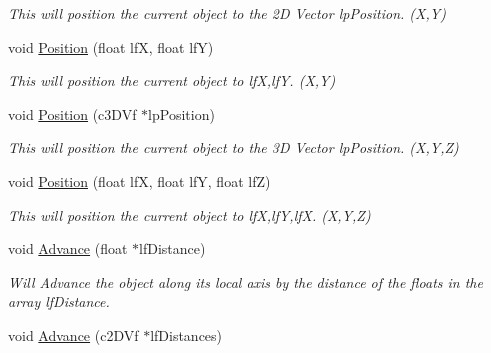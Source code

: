 \begin{DoxyCompactItemize}
\begin{DoxyCompactList}\small\item\em This will position the current object to the 2D Vector lpPosition. (X,Y) \end{DoxyCompactList}\item 
\hypertarget{classc_matrix4_a81cd364d37dc5eae6f968551331ad7a3}{
void \hyperlink{classc_matrix4_a81cd364d37dc5eae6f968551331ad7a3}{Position} (float lfX, float lfY)}
\label{classc_matrix4_a81cd364d37dc5eae6f968551331ad7a3}

\begin{DoxyCompactList}\small\item\em This will position the current object to lfX,lfY. (X,Y) \end{DoxyCompactList}\item 
\hypertarget{classc_matrix4_a8a49976693c27e4fbb5fce427eb6bcf5}{
void \hyperlink{classc_matrix4_a8a49976693c27e4fbb5fce427eb6bcf5}{Position} (c3DVf $\ast$lpPosition)}
\label{classc_matrix4_a8a49976693c27e4fbb5fce427eb6bcf5}

\begin{DoxyCompactList}\small\item\em This will position the current object to the 3D Vector lpPosition. (X,Y,Z) \end{DoxyCompactList}\item 
\hypertarget{classc_matrix4_ae404d9b94cb676d9896385fef1eda422}{
void \hyperlink{classc_matrix4_ae404d9b94cb676d9896385fef1eda422}{Position} (float lfX, float lfY, float lfZ)}
\label{classc_matrix4_ae404d9b94cb676d9896385fef1eda422}

\begin{DoxyCompactList}\small\item\em This will position the current object to lfX,lfY,lfX. (X,Y,Z) \end{DoxyCompactList}\item 
\hypertarget{classc_matrix4_a91f9e8d79d7721ba35f59c754a5507d1}{
void \hyperlink{classc_matrix4_a91f9e8d79d7721ba35f59c754a5507d1}{Advance} (float $\ast$lfDistance)}
\label{classc_matrix4_a91f9e8d79d7721ba35f59c754a5507d1}

\begin{DoxyCompactList}\small\item\em Will Advance the object along its local axis by the distance of the floats in the array lfDistance. \end{DoxyCompactList}\item 
\hypertarget{classc_matrix4_a6c53b28448e2d2531a19cd49955f5901}{
void \hyperlink{classc_matrix4_a6c53b28448e2d2531a19cd49955f5901}{Advance} (c2DVf $\ast$lfDistances)}
\label{classc_matrix4_a6c53b28448e2d2531a19cd49955f5901}


\end{DoxyCompactItemize}
